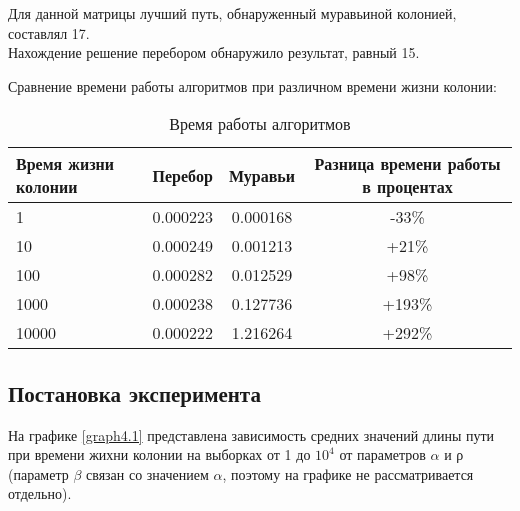 \documentclass[12pt,a4paper]{scrartcl}
\begin{document}
Для данной матрицы лучший путь, обнаруженный муравьиной колонией, составлял 17. \\

Нахождение решение перебором обнаружило результат, равный 15. 

Сравнение времени работы алгоритмов при различном времени жизни колонии: 

\begin{table}[ht]
	\caption{Время работы алгоритмов}
	\begin{tabular}{|l|c|c|c|}
		\hline
		Время жизни колонии & Перебор & Муравьи & Разница времени работы в процентах\\
		\hline
		\hline
		1 & 0.000223 & 0.000168 & -33\%\\
		\hline
		10 & 0.000249 & 0.001213 & +21\%\\
		\hline
		100 & 0.000282 & 0.012529 & +98\%\\
		\hline
		1000 & 0.000238 & 0.127736 & +193\%\\
		\hline
		10000 & 0.000222 & 1.216264 & +292\%\\
		\hline
	\end{tabular}
	\label{tab:tabular}
\end{table}

\subsection{Постановка эксперимента}  

На графике \ref{graph4.1} представлена зависимость средних значений длины пути при времени жихни колонии на выборках от 1 до $10^4$ от параметров $\alpha$ и ρ (параметр $\beta$ связан со значением $\alpha$, поэтому на графике не рассматривается отдельно).
\end{document}
